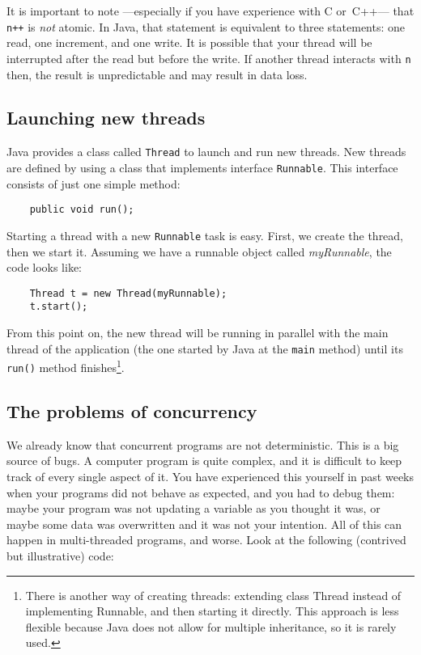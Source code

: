 It is important to note ---especially if you have experience with C
or~C++--- that \verb_n++_ is \emph{not} atomic. In Java, that
statement is equivalent to three statements: one read, one increment,
and one write. It is possible that your thread will be interrupted
after the read but before the write. If another thread interacts
with \verb+n+ then, the result is unpredictable and may result in data
loss. 

\subsection{Launching new threads}
\label{sec:launch-new-thre}

Java provides a class called \verb+Thread+ to launch and run new threads. New
threads are defined by using a class that implements interface
\verb+Runnable+. This interface consists of just one simple method: 

\begin{verbatim}
    public void run();
\end{verbatim}

Starting a thread with a new \verb+Runnable+ task is easy. First, we
create the thread, then we start it. Assuming we have a runnable
object called \emph{myRunnable}, the code looks like:

\begin{verbatim}
    Thread t = new Thread(myRunnable);
    t.start();
\end{verbatim}

From this point on, the new thread will be running in parallel with
the main thread of the application (the one started by Java at the
\verb+main+ method) until its \verb+run()+ method
finishes\footnote{There is another way of creating threads: extending
  class Thread instead of implementing Runnable, and then starting it
  directly. This approach is less flexible because Java 
  does not allow for multiple inheritance, so it is rarely used.}. 

\subsection{The problems of concurrency}
\label{sec:problems-concurrency}

We already know that concurrent programs are not deterministic. This
is a big source of bugs. A computer program is quite complex, and it
is difficult to keep track of every single aspect of it. You have
experienced this yourself in past weeks when your programs did not
behave as expected, and you had to debug them: maybe your program was
not updating a variable as you thought it was, or maybe some data was
overwritten and it was not your intention. All of this can happen in
multi-threaded programs, and worse. Look at the following (contrived
but illustrative) code: 

